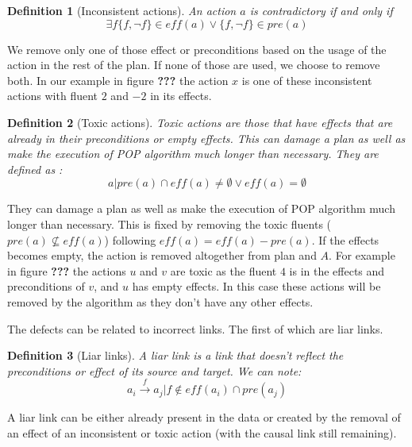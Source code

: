 \documentclass[]{article}
\newtheorem{definition}{Definition}
\begin{document}
\begin{definition}[Inconsistent actions]

An action \(a\) is contradictory if and only if
\[\exists f \{f, \lnot f \} \in eff(a) \lor \{f, \lnot f \} \in pre(a)\]

\end{definition}

We remove only one of those effect or preconditions based on the usage
of the action in the rest of the plan. If none of those are used, we
choose to remove both. In our example in figure \textbf{???} the action
\(x\) is one of these inconsistent actions with fluent \(2\) and \(-2\)
in its effects.

\begin{definition}[Toxic actions]

Toxic actions are those that have effects that are already in their
preconditions or empty effects. This can damage a plan as well as make
the execution of POP algorithm much longer than necessary. They are
defined as :
\[a | pre(a) \cap eff(a) \neq \emptyset \lor eff(a) = \emptyset\]

\end{definition}

They can damage a plan as well as make the execution of POP algorithm
much longer than necessary. This is fixed by removing the toxic fluents
(\(pre(a) \nsubseteq eff(a)\)) following \(eff(a) = eff(a)-pre(a)\). If
the effects becomes empty, the action is removed altogether from plan
and \(A\). For example in figure \textbf{???} the actions \(u\) and
\(v\) are toxic as the fluent \(4\) is in the effects and preconditions
of \(v\), and \(u\) has empty effects. In this case these actions will
be removed by the algorithm as they don't have any other effects.

The defects can be related to incorrect links. The first of which are
liar links.

\begin{definition}[Liar links]

A liar link is a link that doesn't reflect the preconditions or effect
of its source and target. We can note:
\[a_i \xrightarrow{f} a_j | f \notin eff(a_i) \cap pre(a_j)\]

\end{definition}

A liar link can be either already present in the data or created by the
removal of an effect of an inconsistent or toxic action (with the causal
link still remaining).
\end{document}

